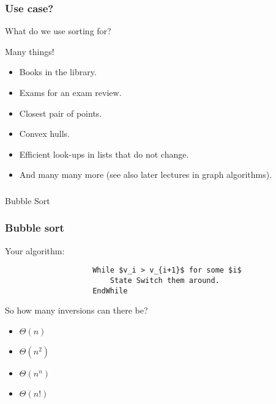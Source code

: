 \begin{frame}
	\frametitle{Use case?}
		What do we use sorting for?
	
Many things!
		\begin{itemize}
			\item Books in the library.
			\item Exams for an exam review.
			\item Closest pair of points.
			\item Convex hulls.
			\item Efficient look-ups in lists that do not change.
			\item And many many more (see also later lectures in graph algorithms).
		\end{itemize}	
\end{frame}

\begin{frame}[fragile]\frametitle{}
\begin{center}
{\Large Bubble Sort}
\end{center}

\end{frame}


\begin{frame}[fragile]
	\frametitle{Bubble sort}
	
Your algorithm:
				\begin{lstlisting}
					While $v_i > v_{i+1}$ for some $i$
						State Switch them around.	
					EndWhile
				\end{lstlisting}
			
			\begin{center}
			
			\end{center}

				So how many inversions can there be?
				\begin{itemize}
					\item $\Theta(n)$
					\item $\Theta(n^2)$
					\item $\Theta(n^n)$
					\item $\Theta(n!)$
				\end{itemize}
\end{frame}

